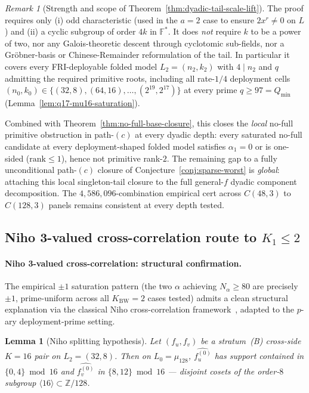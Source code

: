 \documentclass[11pt]{article}
\newtheorem{lemma}[theorem]{Lemma}
\theoremstyle{definition}
\theoremstyle{remark}
\newtheorem{remark}[theorem]{Remark}
\begin{document}
\begin{remark}[Strength and scope of
Theorem~\ref{thm:dyadic-tail-scale-lift}]
\label{rem:dyadic-tail-strength}
The proof requires only (i) odd characteristic (used in the $a = 2$
case to ensure $2 x^r \neq 0$ on $L$) and (ii) a cyclic subgroup of
order $4k$ in $\mathbb{F}^*$. It does \emph{not} require $k$ to be a
power of two, nor any Galois-theoretic descent through cyclotomic
sub-fields, nor a Gr\"obner-basis or Chinese-Remainder reformulation
of the tail. In particular it covers every FRI-deployable folded
model $L_2 = (n_2, k_2)$ with $4 \mid n_2$ and $q$ admitting the
required primitive roots, including all rate-$1/4$ deployment cells
$(n_0, k_0) \in \{(32, 8), (64, 16), \ldots, (2^{19}, 2^{17})\}$ at
every prime $q \geq 97 = Q_{\min}$
(Lemma~\ref{lem:q17-mu16-saturation}).

Combined with Theorem~\ref{thm:no-full-base-closure}, this closes the
\emph{local} no-full primitive obstruction in path-$(c)$ at every
dyadic depth: every saturated no-full candidate at every
deployment-shaped folded model satisfies $\alpha_1 = 0$ or is
one-sided ($\mathrm{rank} \leq 1$), hence not primitive rank-$2$.
The remaining gap to a fully unconditional path-$(c)$ closure of
Conjecture~\ref{conj:sparse-worst} is \emph{global}: attaching this
local singleton-tail closure to the full general-$f$ dyadic
component decomposition. The $4{,}586{,}096$-combination empirical
cert across $C(48, 3)$ to $C(128, 3)$ panels remains consistent at
every depth tested.
\end{remark}


\subsection{Niho 3-valued cross-correlation route to $K_1 \leq 2$}
\label{app:layer3-niho}

\paragraph{Niho 3-valued cross-correlation: structural confirmation.}
The empirical $\pm 1$ saturation pattern (the two $\alpha$ achieving
$N_\alpha \geq 80$ are precisely $\pm 1$, prime-uniform across all
$K_{\mathrm{BW}}=2$ cases tested) admits a clean structural explanation
via the classical Niho cross-correlation framework~\cite{HollmannXiang2001},
adapted to the $p$-ary deployment-prime setting.

\begin{lemma}[Niho splitting hypothesis]
\label{lem:niho-splitting}
Let $(f_u, f_v)$ be a stratum~(B) cross-side $K = 16$ pair on
$L_2 = (32, 8)$. Then on $L_0 = \mu_{128}$, $\hat{f_u^{(0)}}$ has
support contained in $\{0, 4\} \bmod 16$ and $\hat{f_v^{(0)}}$ in
$\{8, 12\} \bmod 16$ — disjoint cosets of the order-$8$ subgroup
$\langle 16 \rangle \subset \mathbb{Z}/128$.
\end{lemma}
\end{document}
